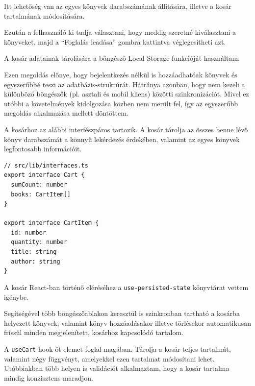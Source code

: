 Itt lehetőség van az egyes könyvek darabszámának állítására, illetve a kosár tartalmának módosítására.

Ezután a felhasználó ki tudja választani, hogy meddig szeretné kiválasztani a könyveket, majd a ``Foglalás leadása'' gombra kattintva
véglegesítheti azt.

A kosár adatainak tárolására a böngésző Local Storage funkcióját használtam.

Ezen megoldás előnye, hogy bejelentkezés nélkül is hozzáadhatóak könyvek és egyszerűbbé teszi az adatbázis-struktúrát.
Hátránya azonban, hogy nem kezeli a különböző böngészők (pl. asztali és mobil kliens) közötti szinkronizációt. Mivel ez utóbbi a
követelmények kidolgozása közben nem merült fel, így az egyszerűbb megoldás alkalmazása mellett döntöttem.

A kosárhoz az alábbi interfészpáros tartozik. A kosár tárolja az összes benne lévő könyv darabszámát a könnyű lekérdezés érdekében,
valamint az egyes könyvek legfontosabb információit.

\begin{lstlisting}[caption=Kosárhoz tartozó TypeScript interfészek]
// src/lib/interfaces.ts
export interface Cart {
  sumCount: number
  books: CartItem[]
}

export interface CartItem {
  id: number
  quantity: number
  title: string
  author: string
}
\end{lstlisting}

A kosár React-ban történő eléréséhez a \lstinline|use-persisted-state|\cite{PersistedState} könyvtárat vettem igénybe.

Segítségével több böngészőablakon keresztül is szinkronban tartható a kosárba helyezett könyvek,
valamint könyv hozzáadásakor illetve törlésekor automatikusan frissül minden megjelenített, kosárhoz kapcsolódó tartalom.

A \lstinline|useCart| hook öt elemet foglal magában. Tárolja a kosár teljes tartalmát, valamint négy függvényt, amelyekkel ezen tartalmat módosítani lehet.
Utóbbiakban több helyen is validációt alkalmaztam, hogy a kosár tartalma mindig konzisztens maradjon.


